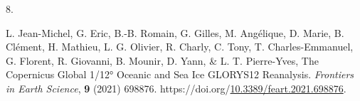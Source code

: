 \documentclass[
  9pt,
  letterpaper,
  DIV=11,
  numbers=noendperiod]{scrartcl}
\newlength{\cslhangindent}
\newlength{\csllabelwidth}
\newenvironment{CSLReferences}[2] %
 {\begin{list}{}{%
  \setlength{\itemindent}{0pt}
  \setlength{\leftmargin}{0pt}
  \setlength{\parsep}{0pt}
  \ifodd #1
   \setlength{\leftmargin}{\cslhangindent}
   \setlength{\itemindent}{-1\cslhangindent}
  \fi
  \setlength{\itemsep}{#2\baselineskip}}}
 {\end{list}}
\newcommand{\CSLLeftMargin}[1]{\parbox[t]{\csllabelwidth}{\strut#1\strut}}
\newcommand{\CSLRightInline}[1]{\parbox[t]{\linewidth - \csllabelwidth}{\strut#1\strut}}
\begin{document}
\begin{CSLReferences}{0}{0}
\CSLLeftMargin{8. }%
\CSLRightInline{L. Jean-Michel, G. Eric, B.-B. Romain, G. Gilles, M.
Angélique, D. Marie, B. Clément, H. Mathieu, L. G. Olivier, R. Charly,
C. Tony, T. Charles-Emmanuel, G. Florent, R. Giovanni, B. Mounir, D.
Yann, \& L. T. Pierre-Yves, The {Copernicus} {Global} 1/12° {Oceanic}
and {Sea} {Ice} {GLORYS12} {Reanalysis}. \emph{Frontiers in Earth
Science}, \textbf{9} (2021) 698876.
https://doi.org/\href{https://doi.org/10.3389/feart.2021.698876}{10.3389/feart.2021.698876}.}

\end{CSLReferences}
\end{document}

